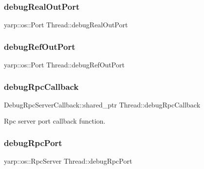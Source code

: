 \subsubsection{\texorpdfstring{debug\+Real\+Out\+Port}{debugRealOutPort}}
{\footnotesize\ttfamily yarp\+::os\+::\+Port Thread\+::debug\+Real\+Out\+Port\hspace{0.3cm}{\ttfamily [private]}}

\hypertarget{classThread_a3780b51f82c50fd2738afbd0ae9b9526}{}\label{classThread_a3780b51f82c50fd2738afbd0ae9b9526} 
\subsubsection{\texorpdfstring{debug\+Ref\+Out\+Port}{debugRefOutPort}}
{\footnotesize\ttfamily yarp\+::os\+::\+Port Thread\+::debug\+Ref\+Out\+Port\hspace{0.3cm}{\ttfamily [private]}}

\hypertarget{classThread_a42833af67d5280e6946a31a03737e017}{}\label{classThread_a42833af67d5280e6946a31a03737e017} 
\subsubsection{\texorpdfstring{debug\+Rpc\+Callback}{debugRpcCallback}}
{\footnotesize\ttfamily Debug\+Rpc\+Server\+Callback\+::shared\+\_\+ptr Thread\+::debug\+Rpc\+Callback\hspace{0.3cm}{\ttfamily [private]}}

Rpc server port callback function. \hypertarget{classThread_aa6b8f3712e7776d560b0a535eff73c34}{}\label{classThread_aa6b8f3712e7776d560b0a535eff73c34} 
\subsubsection{\texorpdfstring{debug\+Rpc\+Port}{debugRpcPort}}
{\footnotesize\ttfamily yarp\+::os\+::\+Rpc\+Server Thread\+::debug\+Rpc\+Port\hspace{0.3cm}{\ttfamily [private]}}

\hypertarget{classThread_aa59863bb50c8aa88fe5872e75be44cb7}{}\label{classThread_aa59863bb50c8aa88fe5872e75be44cb7} 
